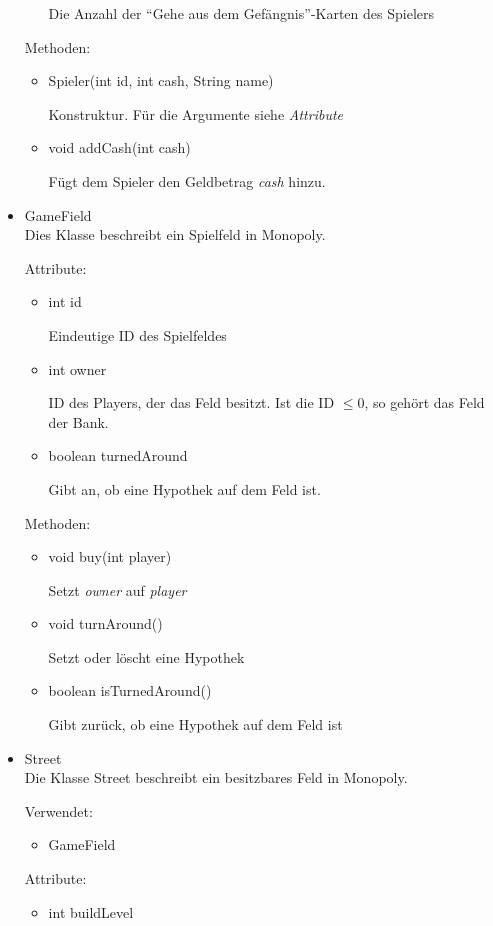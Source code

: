 \documentclass[a4paper,10pt]{article}
\begin{document}
\begin{itemize}
\begin{itemize}
Die Anzahl der "`Gehe aus dem Gefängnis"'-Karten des Spielers
\end{itemize} %

Methoden:
\begin{itemize}
\item Spieler(int id, int cash, String name)

Konstruktur. Für die Argumente siehe \textit{Attribute}
\item void addCash(int cash)

Fügt dem Spieler den Geldbetrag \textit{cash} hinzu.
\end{itemize} %

\item GameField \\
Dies Klasse beschreibt ein Spielfeld in Monopoly.

Attribute:
\begin{itemize}
\item int id

Eindeutige ID des Spielfeldes
\item int owner

ID des Players, der das Feld besitzt. Ist die ID $\le 0$, so gehört das Feld der Bank.
\item boolean turnedAround

Gibt an, ob eine Hypothek auf dem Feld ist.
\end{itemize} %

Methoden:
\begin{itemize}
\item void buy(int player)

Setzt \textit{owner} auf \textit{player}
\item void turnAround()

Setzt oder löscht eine Hypothek
\item boolean isTurnedAround()

Gibt zurück, ob eine Hypothek auf dem Feld ist
\end{itemize} %

\item Street \\
Die Klasse Street beschreibt ein besitzbares Feld in Monopoly.

Verwendet:
\begin{itemize}
\item GameField
\end{itemize}

Attribute:
\begin{itemize}
\item int buildLevel


\end{itemize}
\end{itemize}
\end{document}
